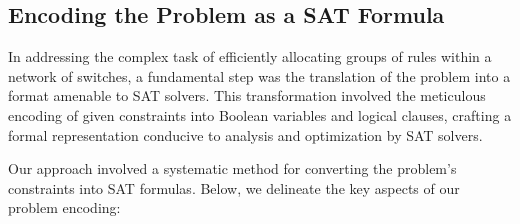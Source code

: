 \subsection{Encoding the Problem as a SAT Formula}

In addressing the complex task of efficiently allocating groups of rules within a network of switches, a fundamental step was the translation of the problem into a format amenable to SAT solvers. This transformation involved the meticulous encoding of given constraints into Boolean variables and logical clauses, crafting a formal representation conducive to analysis and optimization by SAT solvers.

Our approach involved a systematic method for converting the problem's constraints into SAT formulas. Below, we delineate the key aspects of our problem encoding:

